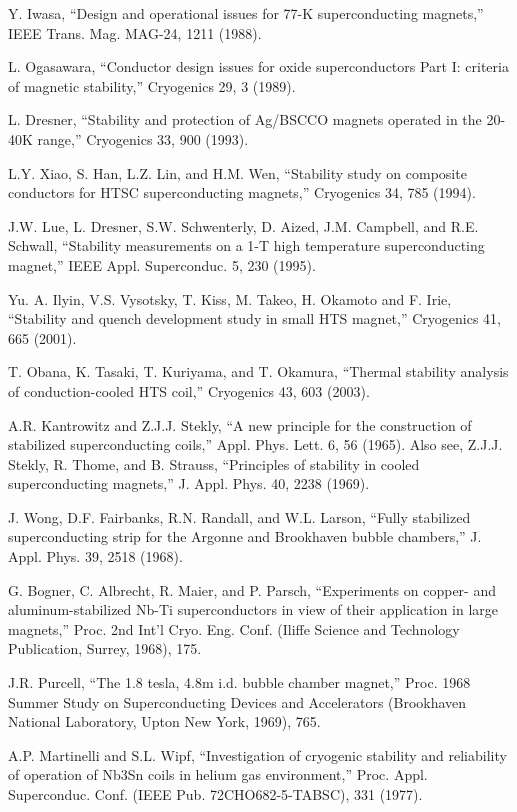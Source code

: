 \noindent [6.2] Y. Iwasa, ``Design and operational issues for 77-K superconducting magnets,” IEEE Trans. Mag. MAG-24, 1211 (1988).

\noindent [6.3] L. Ogasawara, ``Conductor design issues for oxide superconductors Part I: criteria of magnetic stability,” Cryogenics 29, 3 (1989).

\noindent [6.4] L. Dresner, ``Stability and protection of Ag/BSCCO magnets operated in the 20-40K range,” Cryogenics 33, 900 (1993).

\noindent [6.5] L.Y. Xiao, S. Han, L.Z. Lin, and H.M. Wen, ``Stability study on composite conductors for HTSC superconducting magnets,” Cryogenics 34, 785 (1994).

\noindent [6.6] J.W. Lue, L. Dresner, S.W. Schwenterly, D. Aized, J.M. Campbell, and R.E. Schwall, ``Stability measurements on a 1-T high temperature superconducting magnet,”
IEEE Appl. Superconduc. 5, 230 (1995).

\noindent [6.7] Yu. A. Ilyin, V.S. Vysotsky, T. Kiss, M. Takeo, H. Okamoto and F. Irie, ``Stability
and quench development study in small HTS magnet,” Cryogenics 41, 665 (2001).

\noindent [6.8] T. Obana, K. Tasaki, T. Kuriyama, and T. Okamura, ``Thermal stability analysis
of conduction-cooled HTS coil,” Cryogenics 43, 603 (2003).

\noindent [6.9] A.R. Kantrowitz and Z.J.J. Stekly, ``A new principle for the construction of stabilized superconducting coils,” Appl. Phys. Lett. 6, 56 (1965). Also see, Z.J.J. Stekly,
R. Thome, and B. Strauss, ``Principles of stability in cooled superconducting magnets,”
J. Appl. Phys. 40, 2238 (1969).

\noindent [6.10] J. Wong, D.F. Fairbanks, R.N. Randall, and W.L. Larson, ``Fully stabilized superconducting strip for the Argonne and Brookhaven bubble chambers,” J. Appl. Phys. 39, 2518 (1968).

\noindent [6.11] G. Bogner, C. Albrecht, R. Maier, and P. Parsch, ``Experiments on copper- and
aluminum-stabilized Nb-Ti superconductors in view of their application in large
magnets,” Proc. 2nd Int’l Cryo. Eng. Conf. (Iliffe Science and Technology Publication,
Surrey, 1968), 175.

\noindent [6.12] J.R. Purcell, ``The 1.8 tesla, 4.8m i.d. bubble chamber magnet,” Proc. 1968 Summer
Study on Superconducting Devices and Accelerators (Brookhaven National
Laboratory, Upton New York, 1969), 765.

\noindent [6.13] A.P. Martinelli and S.L. Wipf, ``Investigation of cryogenic stability and reliability
of operation of Nb3Sn coils in helium gas environment,” Proc. Appl. Superconduc.
Conf. (IEEE Pub. 72CHO682-5-TABSC), 331 (1977).

